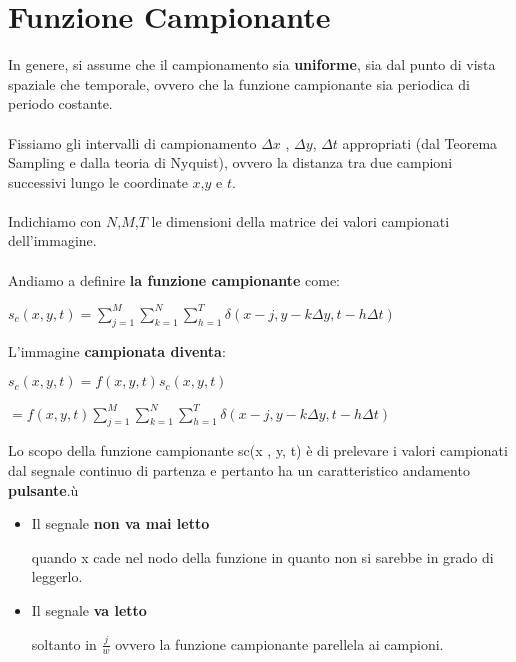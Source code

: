 \section{Funzione Campionante}
In genere, si assume che il campionamento sia \textbf{uniforme}, sia dal punto
di vista spaziale che temporale, ovvero che la funzione campionante sia
periodica di periodo costante. \\\\Fissiamo gli intervalli di campionamento
$\Delta x$ , $\Delta y$, $\Delta t$ appropriati (dal Teorema Sampling e dalla
teoria di Nyquist), ovvero la distanza tra due campioni successivi lungo le
coordinate $x$,$y$ e $t$. \\\\Indichiamo con $N$,$M$,$T$ le dimensioni della
matrice dei valori campionati dell’immagine. \\\\Andiamo a definire \textbf{la
    funzione campionante} come:
\begin{center}
    $s_c(x,y,t) = \sum_{j=1}^{M} \sum_{k=1}^{N}\sum_{h=1}^{T} \delta (x-j, y - k
        \Delta y, t - h  \Delta t )$
\end{center}
L'immagine \textbf{campionata diventa}:
\begin{center}
    $s_c(x,y,t) = f(x,y,t)s_c(x,y,t)$
\end{center}
\begin{center}
    $= f(x,y,t) \sum_{j=1}^{M} \sum_{k=1}^{N}\sum_{h=1}^{T} \delta (x-j, y - k
        \Delta y, t - h  \Delta t )$
\end{center}
Lo scopo della funzione campionante sc(x , y, t) è di prelevare i valori
campionati dal segnale continuo di partenza e pertanto ha un caratteristico
andamento \textbf{pulsante}.ù
\begin{itemize}
    \item Il segnale \textbf{non va mai letto}

          quando x cade nel nodo della funzione in quanto non si sarebbe in
          grado di leggerlo.

    \item Il segnale \textbf{va letto}

          soltanto in $\frac{j}{w}$ ovvero la funzione campionante parellela ai
          campioni.
\end{itemize}

